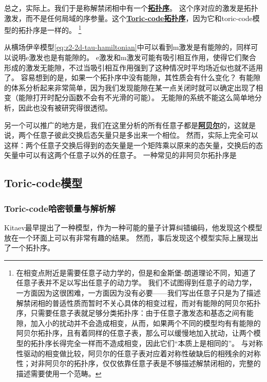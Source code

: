 \documentclass[hyperref, UTF8, a4paper]{ctexart}
\newcommand*{\concept}[1]{\underline{\textbf{#1}}}
\newcommand*{\Ztwo}{$\mathbb{Z}_2$}
\begin{document}
总之，实际上。我们于是称解禁闭相中有一个\concept{拓扑序}。
这个序对应的激发是拓扑激发，而不是任何局域的序参量。这个\concept{Toric-code拓扑序}，因为它和toric-code模型的拓扑序是一样的。%
\footnote{
    在相变点附近是需要任意子动力学的，但是和金斯堡-朗道理论不同，知道了任意子表并不足以写出任意子的动力学。
    我们不试图得到任意子的动力学，一方面因为这很困难，一方面因为没有必要——我们写出任意子只是为了描述解禁闭相的普适性质而暂时不关心具体的相变过程，而对有能隙的阿贝尔拓扑序，只需要任意子表就足够分类拓扑序：由于任意子激发态和基态之间有能隙，加入小的扰动并不会造成相变，从而，如果两个不同的模型均有有能隙的阿贝尔拓扑序，且有着同样的任意子表，那么可以缓慢地加入扰动，让两个模型的拓扑序长得完全一样而不造成相变，因此它们“本质上是相同的”。
    与对称性驱动的相变做比较，阿贝尔的任意子表对应着对称性破缺后的相残余的对称性；对非阿贝尔的拓扑序，仅仅依靠任意子表是不够描述解禁闭相的，完整的描述需要使用一个范畴。
}%

从横场伊辛模型\eqref{eq:z2-2d-tau-hamiltonian}中可以看到m激发是有能隙的，同样可以说明e激发也是有能隙的。
e激发和m激发可能有吸引相互作用，使得它们聚合形成的激发无能隙，不过当吸引相互作用强到了这种情况时平均场近似也就不适用了。
容易想到的是，如果一个拓扑序中没有能隙，其性质会有什么变化？
有能隙的体系分析起来非常简单，因为我们发现能隙在某一点关闭时就可以确定出现了相变（能隙打开时配分函数不会有不光滑的可能）。
无能隙的系统不能这么简单地分析，因此也没有被研究得很透彻。

另一个可以推广的地方是，我们在这里分析的所有任意子都是\concept{阿贝尔}的，这就是说，两个任意子彼此交换后态矢量只是多出来一个相位。
然而，实际上完全可以这样：两个任意子交换后得到的态矢量是一个矩阵乘以原来的态矢量，交换后的态矢量中可以有这两个任意子以外的任意子。
一种常见的非阿贝尔拓扑序是



\subsection{Toric-code模型}

\subsubsection{Toric-code哈密顿量与解析解}

Kitaev最早提出了一种模型，作为一种可能的量子计算纠错编码，他发现这个模型放在一个环面上可以有非常有趣的结果。
然而，事后发现这个模型实际上展现出了一个拓扑序。
\end{document}
